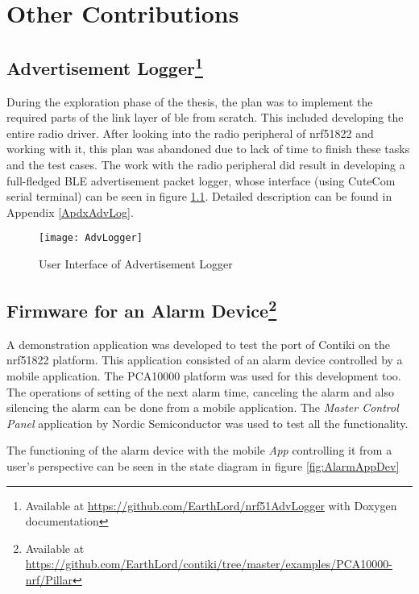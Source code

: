 \chapter{Other Contributions}

\section[Advertisement Logger]{Advertisement Logger\footnote{Available at \url{https://github.com/EarthLord/nrf51AdvLogger} with Doxygen documentation}} \label{8AdvLogger}

During the exploration phase of the thesis, the plan was to implement the required parts of the link layer of \gls{ble} from scratch. This included developing the entire radio driver. After looking into the radio peripheral of nrf51822 and working with it, this plan was abandoned due to lack of time to finish these tasks and the test cases. The work with the radio peripheral did result in developing a full-fledged BLE advertisement packet logger, whose interface (using CuteCom serial terminal) can be seen in figure \ref{fig:UIAdvLogger}. Detailed description can be found in Appendix \ref{ApdxAdvLog}. 

\begin{figure}[h]
\texttt{[image: AdvLogger]}
\caption{User Interface of Advertisement Logger}
\label{fig:UIAdvLogger}
\end{figure}

\section[Firmware for an Alarm Device]{Firmware for an Alarm Device\footnote{Available at \url{https://github.com/EarthLord/contiki/tree/master/examples/PCA10000-nrf/Pillar}}}

A demonstration application was developed to test the port of Contiki on the nrf51822 platform. This application consisted of an alarm device controlled by a mobile application. The PCA10000 platform was used for this development too. The operations of setting of the next alarm time, canceling the alarm and also silencing the alarm can be done from a mobile application. The \emph{Master Control Panel} application by Nordic Semiconductor was used to test all the functionality.

The functioning of the alarm device with the mobile \emph{App} controlling it from a user's perspective can be seen in the state diagram in figure \ref{fig:AlarmAppDev}

